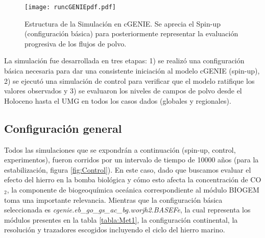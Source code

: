  \begin{figure}[H]
\centering
  \texttt{[image: runcGENIEpdf.pdf]}
  \caption[Estructura de la Simulación en cGENIE]{Estructura de la Simulación en cGENIE. Se aprecia el Spin-up (configuración básica) para posteriormente representar la evaluación progresiva de los flujos de polvo.}
  \label{fig:run}
\end{figure}

La simulación fue desarrollada en tres etapas: 1) se realiz\'o una configuración básica necesaria para dar una consistente iniciación al modelo cGENIE (spin-up), 2) se ejecut\'o una simulación de control para verificar que el modelo ratifique los valores observados y 3) se evaluaron los niveles de campos de polvo desde el Holoceno hasta el UMG en todos los casos dados (globales y regionales). 

\subsection*{Configuración general}

Todos las simulaciones que se expondrán a continuación (spin-up, control, experimentos), fueron corridos por un intervalo de tiempo de 10000 años (para la estabilización, figura \ref{fig:Control}). En este caso, dado que buscamos evaluar el efecto del hierro en la bomba biológica y cómo esto afecta la concentración de CO$_2$, la componente de biogeoquímica oceánica correspondiente al módulo BIOGEM toma una importante relevancia. Mientras que la configuración básica seleccionada es \textit{cgenie.eb\_go\_gs\_ac\_bg.worjh2.BASEFe}, la cual representa los módulos presentes en la tabla \ref{tabla:Met1}, la configuración continental, la resolución y trazadores escogidos incluyendo el ciclo del hierro marino. 

